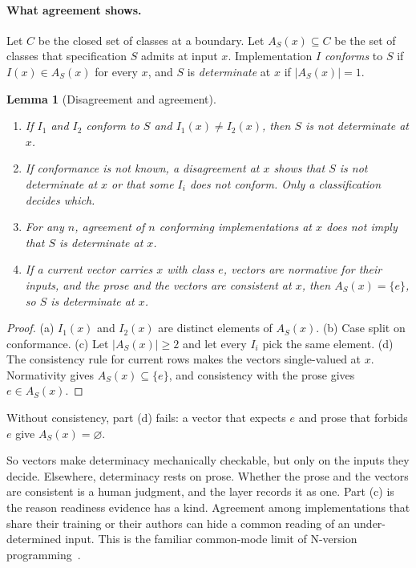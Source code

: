 \documentclass[11pt]{article}
\newtheorem{lemma}[proposition]{Lemma}
\theoremstyle{definition}
\theoremstyle{remark}
\begin{document}
\paragraph{What agreement shows.} Let $C$ be the closed set of classes at a boundary. Let
$A_S(x)\subseteq C$ be the set of classes that specification $S$ admits at input $x$. Implementation
$I$ \emph{conforms} to $S$ if $I(x)\in A_S(x)$ for every $x$, and $S$ is \emph{determinate} at $x$
if $|A_S(x)|=1$.

\begin{lemma}[Disagreement and agreement]\label{lem:agree}
\leavevmode
\begin{enumerate}[label=(\alph*),itemsep=1pt]
\item If $I_1$ and $I_2$ conform to $S$ and $I_1(x)\ne I_2(x)$, then $S$ is not determinate at $x$.
\item If conformance is not known, a disagreement at $x$ shows that $S$ is not determinate at $x$
  \emph{or} that some $I_i$ does not conform. Only a classification decides which.
\item For any $n$, agreement of $n$ conforming implementations at $x$ does not imply that $S$ is
  determinate at $x$.
\item If a current vector carries $x$ with class $e$, vectors are normative for their inputs, and
  the prose and the vectors are consistent at $x$, then $A_S(x)=\{e\}$, so $S$ is determinate at $x$.
\end{enumerate}
\end{lemma}
\begin{proof}
(a) $I_1(x)$ and $I_2(x)$ are distinct elements of $A_S(x)$. (b) Case split on conformance.
(c) Let $|A_S(x)|\ge2$ and let every $I_i$ pick the same element. (d) The consistency rule for
current rows makes the vectors single-valued at $x$. Normativity gives $A_S(x)\subseteq\{e\}$, and
consistency with the prose gives $e\in A_S(x)$.
\end{proof}
\noindent Without consistency, part (d) fails: a vector that expects $e$ and prose that forbids $e$
give $A_S(x)=\varnothing$.

So vectors make determinacy mechanically checkable, but only on the inputs they decide. Elsewhere,
determinacy rests on prose. Whether the prose and the vectors are consistent is a human judgment,
and the layer records it as one. Part (c) is the reason readiness evidence has a kind. Agreement
among implementations that share their training or their authors can hide a common reading of an
under-determined input. This is the familiar common-mode limit of N-version
programming~\cite{knight1986}.
\end{document}
